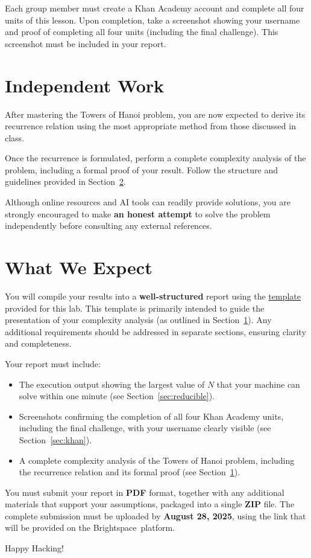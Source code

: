 \documentclass[12pt]{article}
\begin{document}
Each group member must create a Khan Academy account and complete all four units of this lesson. Upon completion, take a screenshot showing your username and proof of completing all four units (including the final challenge). This screenshot must be included in your report.

\section{Independent Work} \label{sec:work}
After mastering the Towers of Hanoi problem, you are now expected to derive its recurrence relation using the most appropriate method from those discussed in class.

Once the recurrence is formulated, perform a complete complexity analysis of the problem, including a formal proof of your result. Follow the structure and guidelines provided in Section~\ref{sec:expect}.

Although online resources and AI tools can readily provide solutions, you are strongly encouraged to make \textbf{an honest attempt} to solve the problem independently before consulting any external references.

\section{What We Expect} \label{sec:expect}
You will compile your results into a \textbf{well-structured} report using the \href{https://drive.google.com/file/d/12l-CiOO4Xd7uX3e1DXprb32XqQnhPz3E/view?usp=sharing}{template} provided for this lab. This template is primarily intended to guide the presentation of your complexity analysis (as outlined in Section~\ref{sec:work}). Any additional requirements should be addressed in separate sections, ensuring clarity and completeness.

Your report must include:
\begin{itemize}
    \item The execution output showing the largest value of $N$ that your machine can solve within one minute (see Section~\ref{sec:reducible}).
    \item Screenshots confirming the completion of all four Khan Academy units, including the final challenge, with your username clearly visible (see Section~\ref{sec:khan}).
    \item A complete complexity analysis of the Towers of Hanoi problem, including the recurrence relation and its formal proof (see Section~\ref{sec:work}).
\end{itemize}

You must submit your report in \textbf{\large PDF} format, together with any additional materials that support your assumptions, packaged into a single \textbf{ZIP} file. The complete submission must be uploaded by \textbf{August 28, 2025}, using the link that will be provided on the Brightspace\texttrademark\ platform.

\vspace{5mm}
Happy Hacking! 
\end{document}
